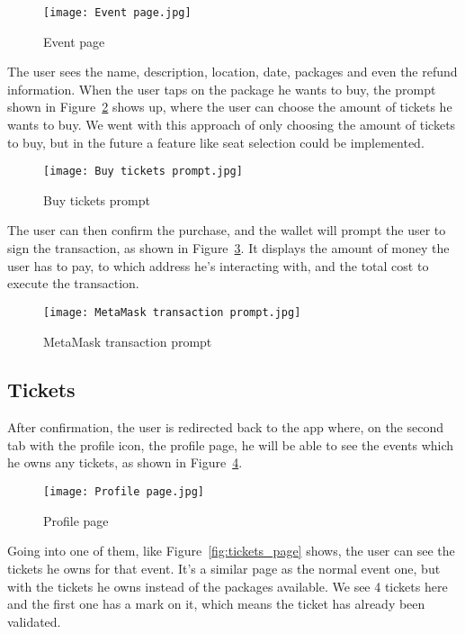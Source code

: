 \begin{figure}[H]
	\texttt{[image: Event page.jpg]}
	\centering
	\caption{Event page}\label{fig:event_page}
\end{figure}

The user sees the name, description, location, date, packages and even the
refund information. When the user taps on the package he wants to buy, the
prompt shown in Figure~\ref{fig:buy_tickets_prompt} shows up, where the user
can choose the amount of tickets he wants to buy. We went with this approach of
only choosing the amount of tickets to buy, but in the future a feature like
seat selection could be implemented.

\begin{figure}[H]
	\texttt{[image: Buy tickets prompt.jpg]}
	\centering
	\caption{Buy tickets prompt}\label{fig:buy_tickets_prompt}
\end{figure}

The user can then confirm the purchase, and the wallet will prompt the user to
sign the transaction, as shown in Figure~\ref{fig:metamask_transaction_prompt}.
It displays the amount of money the user has to pay, to which address he's
interacting with, and the total cost to execute the transaction.

\begin{figure}[H]
	\texttt{[image: MetaMask transaction prompt.jpg]}
	\centering
	\caption{MetaMask transaction prompt}\label{fig:metamask_transaction_prompt}
\end{figure}

\subsection{Tickets}\label{subsec:tickets}

After confirmation, the user is redirected back to the app where, on the second
tab with the profile icon, the profile page, he will be able to see the events
which he owns any tickets, as shown in Figure~\ref{fig:profile_page}.

\begin{figure}[H]
	\texttt{[image: Profile page.jpg]}
	\centering
	\caption{Profile page}\label{fig:profile_page}
\end{figure}

Going into one of them, like Figure~\ref{fig:tickets_page} shows, the user can
see the tickets he owns for that event. It's a similar page as the normal event
one, but with the tickets he owns instead of the packages available. We see 4
tickets here and the first one has a mark on it, which means the ticket has
already been validated.

